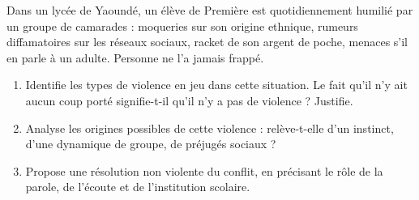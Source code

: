 \documentclass[11pt]{article}
\begin{document}
\begin{exercice}
Dans un lycée de Yaoundé, un élève de Première est quotidiennement humilié par un groupe de camarades : moqueries sur son origine ethnique, rumeurs diffamatoires sur les réseaux sociaux, racket de son argent de poche, menaces s'il en parle à un adulte. Personne ne l'a jamais frappé.

\begin{enumerate}
\item Identifie les types de violence en jeu dans cette situation. Le fait qu'il n'y ait aucun coup porté signifie-t-il qu'il n'y a pas de violence ? Justifie.
\item Analyse les origines possibles de cette violence : relève-t-elle d'un instinct, d'une dynamique de groupe, de préjugés sociaux ?
\item Propose une résolution non violente du conflit, en précisant le rôle de la parole, de l'écoute et de l'institution scolaire.
\end{enumerate}
\end{exercice}
\end{document}
